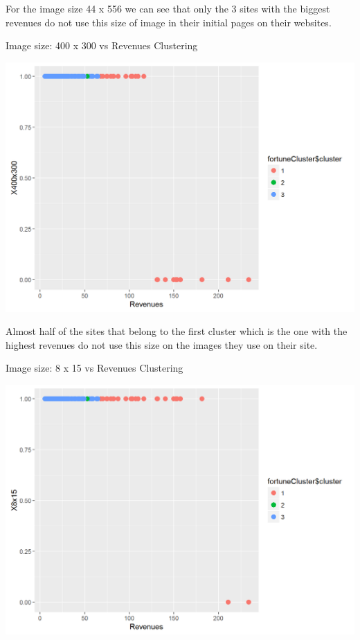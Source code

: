 \documentclass{book}
\begin{document}
For the image size 44 x 556 we can see that only the 3 sites with the biggest revenues do not use this size of image in their initial pages on their websites.
\begin{table}[H]
\centering
\caption{Image size: 400 x 300 vs Revenues Clustering}
\begin{center}
\includegraphics[scale=0.4]{../R/photos/98_clust_400.png}   \\
\end{center}
\end{table}
Almost half of the sites that belong to the first cluster which is the one with the highest revenues do not use this size on the images they use on their site.
\begin{table}[H]
\centering
\caption{Image size: 8 x 15 vs Revenues Clustering}
\begin{center}
\includegraphics[scale=0.4]{../R/photos/99_clust_8x15.png}   \\
\end{center}
\end{table}
\end{document}
